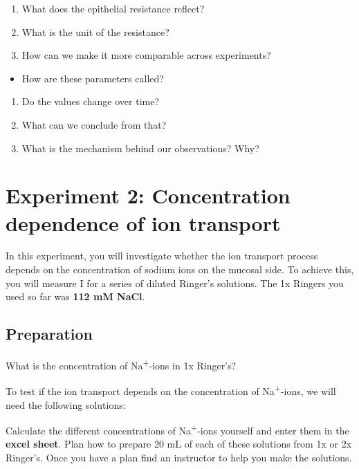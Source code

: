 \documentclass[
]{book}
\providecommand{\tightlist}{%
  \setlength{\itemsep}{0pt}\setlength{\parskip}{0pt}}
\begin{document}
\begin{enumerate}
\def\labelenumi{\arabic{enumi}.}
\item
  What does the epithelial resistance reflect?
\item
  What is the unit of the resistance?
\item
  How can we make it more comparable across experiments?
\end{enumerate}

\begin{itemize}
\tightlist
\item
  How are these parameters called?
\end{itemize}

\begin{enumerate}
\def\labelenumi{\arabic{enumi}.}
\setcounter{enumi}{3}
\item
  Do the values change over time?
\item
  What can we conclude from that?
\item
  What is the mechanism behind our observations? Why?
\end{enumerate}

\chapter{Experiment 2: Concentration dependence of ion transport}\label{experiment-2-concentration-dependence-of-ion-transport}

In this experiment, you will investigate whether the ion transport process depends on the concentration of sodium ions on the mucosal side. To achieve this, you will measure I for a series of diluted Ringer's solutions. The 1x Ringers you used so far was \textbf{112 mM NaCl}.

\section{Preparation}\label{preparation}

What is the concentration of Na\textsuperscript{+}-ions in 1x Ringer's?

To test if the ion transport depends on the concentration of Na\textsuperscript{+}-ions, we will need the following solutions:

Calculate the different concentrations of Na\textsuperscript{+}-ions yourself and enter them in the \textbf{excel sheet}.
Plan how to prepare 20 mL of each of these solutions from 1x or 2x Ringer's. Once you have a plan find an instructor to help you make the solutions.
\end{document}
